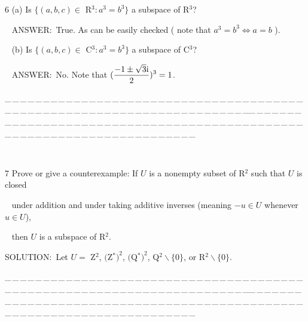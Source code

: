 \documentclass[a4paper, 11pt, UTF8]{article}
\def\i{\textup{i}}
\begin{document}
\begin{large}
{\timesbf\Large 6}
(a) {\timessl\Large Is $\{(a,b,c)\in$ {\timesbf R}$^3:a^3=b^3 \}$ a subspace of {\timesbf R}$^3$?
}\par\,\,\,
{\timesbf A\small{NSWER:}}\,\,\,True. As can be easily checked ( note that $a^3=b^3\Leftrightarrow a=b$ ).\par\,\,\,
(b) {\timessl\Large Is $\{(a,b,c)\in$ {\timesbf C}$^3:a^3=b^3 \}$ a subspace of {\timesbf C}$^3$?
}\par\,\,\,
{\timesbf A\small{NSWER:}}\,\,\,No. Note that $(\displaystyle\frac{-1\pm \sqrt{3}\i}{2})^3=1$.\par
{\tiny \_\,\_\,\_\,\_\,\_\,\_\,\_\,\_\,\_\,\_\,\_\,\_\,\_\,\_\,\_\,\_\,\_\,\_\,\_\,\_\,\_\,\_\,\_\,\_\,\_\,\_\,\_\,\_\,\_\,\_\,\_\,\_\,\_\,\_\,\_\,\_\,\_\,\_\,\_\,\_\,\_\,\_\,\_\,\_\,\_\,\_\,\_\,\_\,\_\,\_\,\_\,\_\,\_\,\_\,\_\,\_\,\_\,\_\,\_\,\_\,\_\,\_\,\_\,\_\,\_\,\_\,\_\,\_\,\_\,\_\,\_\_\,\_\,\_\,\_\,\_\,\_\,\_\,\_\,\_\,\_\,\_\,\_\,\_\,\_\,\_\,\_\,\_\,\_\,\_\,\_\,\_\,\_\,\_\,\_\,\_\,\_\,\_\,\_\,\_\,\_\,\_\,\_\,\_\,\_\,\_\,\_\,\_\,\_\,\_\,\_\,\_\,\_\,\_\,\_\,\_\,\_\,\_\,\_\,\_\,\_\,\_\,\_\,\_\,\_\,\_\,\_\,\_\,\_\,\_\,\_\,\_\,\_\,\_\,\_\,\_\,\_\,\_\,\_\,\_\,\_\,\_}{\tiny\,\par}

{\timesbf\Large 7} {\timessl\Large 
Prove or give a counterexample: If $U$ is a nonempty subset of {\timesbf R}$^2$ such that $U$ is closed}\par\,\,\,
{\timessl\Large
under addition and under taking additive inverses (meaning $-u\in U$ whenever $u\in U$),}\par\,\,\,
{\timessl\Large then $U$ is a subspace of {\timesbf R}$^2$.
}\par
{\timesbf S\footnotesize{OLUTION:}}\,\,\,Let $U=$ {\timesbf Z}$^2$, $(${\timesbf Z}$^*)^2$, $(${\timesbf Q}$^*)^2$, {\timesbf Q}$^2\backslash\{0\}$, or {\timesbf R}$^2\backslash\{0\}$.\par\quad
{\tiny \_\,\_\,\_\,\_\,\_\,\_\,\_\,\_\,\_\,\_\,\_\,\_\,\_\,\_\,\_\,\_\,\_\,\_\,\_\,\_\,\_\,\_\,\_\,\_\,\_\,\_\,\_\,\_\,\_\,\_\,\_\,\_\,\_\,\_\,\_\,\_\,\_\,\_\,\_\,\_\,\_\,\_\,\_\,\_\,\_\,\_\,\_\,\_\,\_\,\_\,\_\,\_\,\_\,\_\,\_\,\_\,\_\,\_\,\_\,\_\,\_\,\_\,\_\,\_\,\_\,\_\,\_\,\_\,\_\,\_\,\_\_\,\_\,\_\,\_\,\_\,\_\,\_\,\_\,\_\,\_\,\_\,\_\,\_\,\_\,\_\,\_\,\_\,\_\,\_\,\_\,\_\,\_\,\_\,\_\,\_\,\_\,\_\,\_\,\_\,\_\,\_\,\_\,\_\,\_\,\_\,\_\,\_\,\_\,\_\,\_\,\_\,\_\,\_\,\_\,\_\,\_\,\_\,\_\,\_\,\_\,\_\,\_\,\_\,\_\,\_\,\_\,\_\,\_\,\_\,\_\,\_\,\_\,\_\,\_\,\_\,\_\,\_\,\_\,\_\,\_\,\_}{\tiny\,\par}


\end{large}
\end{document}
